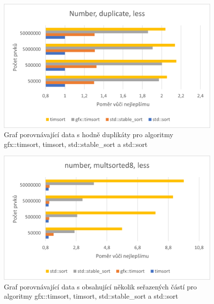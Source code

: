 \documentclass[thesis=B,czech]{FITthesis}[2019/12/23]
\begin{document}
\begin{figure}[htbp]\centering
	\includegraphics{obrazky/graf5.png}
	\caption[Graf porovnávající data s hodně duplikáty pro algoritmy gfx::timsort, timsort, std::stable\_sort a std::sort]{Graf porovnávající data s hodně duplikáty pro algoritmy gfx::timsort, timsort, std::stable\_sort a std::sort}\label{fig:graf5}
\end{figure}

\begin{figure}[htbp]\centering
	\includegraphics{obrazky/graf6.png}
	\caption[Graf porovnávající data s obsahující několik seřazených částí pro algoritmy gfx::timsort, timsort, std::stable\_sort a std::sort]{Graf porovnávající data s obsahující několik seřazených částí pro algoritmy gfx::timsort, timsort, std::stable\_sort a std::sort}\label{fig:graf6}
\end{figure}
\end{document}
